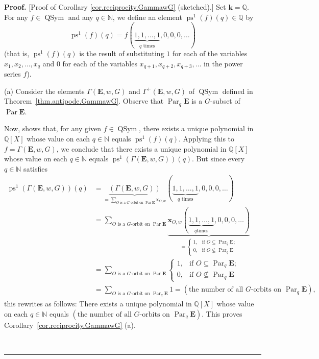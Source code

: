 \documentclass[numbers=enddot,12pt,final,onecolumn,notitlepage,abstracton]{scrartcl}%
\theoremstyle{definition}
\newenvironment{proof}[1][Proof]{\noindent\textbf{#1.} }{\ \rule{0.5em}{0.5em}}
\let\sumnonlimits\sum
\renewcommand{\sum}{\sumnonlimits\limits}
\newcommand{\kk}{{\mathbf{k}}}
\newcommand{\xx}{{\mathbf{x}}}
\newcommand{\QSym}{{\operatorname{QSym}}}
\newcommand{\Par}{\operatorname{Par}}
\newcommand{\EE}{{\mathbf{E}}}
\newcommand{\NN}{{\mathbb{N}}}
\newcommand{\QQ}{{\mathbb{Q}}}
\begin{document}
\begin{proof}
[Proof of Corollary \ref{cor.reciprocity.GammawG} (sketched).]
Set $\kk = \QQ$. For any $f \in \QSym$ and any
$q\in \NN $, we define an element $\operatorname{ps}^{1}\left(
f\right)  \left(  q\right)  \in \QQ$ by
\[
\operatorname{ps}^{1}\left(  f\right)  \left(  q\right)  =f\left(
\underbrace{1,1,\ldots,1}_{q\text{ times}},0,0,0,\ldots\right)
\]
(that is, $\operatorname{ps}^{1}\left(  f\right)  \left(  q\right)
$ is the result of substituting $1$ for each of the variables
$x_{1},x_{2},\ldots,x_{q}$ and $0$ for each of the variables
$x_{q+1},x_{q+2},x_{q+3},\ldots$ in the power series $f$).

(a) Consider the elements $\Gamma\left(   \EE ,w,G\right)  $ and
$\Gamma^{+}\left( \EE ,w,G \right)  $ of $\QSym$
defined in Theorem~\ref{thm.antipode.GammawG}. Observe that
$\Par_q \EE$ is a $G$-subset of $\Par \EE$.

Now, \cite[Proposition 7.7 (i)]{Reiner} shows that, for any given
$f\in \QSym $, there exists a unique polynomial in $\mathbb{Q}%
\left[  X\right]  $ whose value on each $q\in \NN $ equals
$\operatorname{ps}^{1}\left(  f\right)  \left(  q\right)  $.
Applying this to $f=\Gamma\left(   \EE ,w,G\right)  $, we conclude that
there exists a unique polynomial in $\mathbb{Q}\left[  X\right]  $ whose value
on each $q\in \NN $ equals $\operatorname{ps}^{1}\left(
\Gamma\left(   \EE ,w,G\right)  \right)  \left(  q\right)  $. But since
every $q\in \NN $ satisfies
\begin{align}
\operatorname{ps}^{1}\left(  \Gamma\left(   \EE ,w,G\right)
\right)  \left(  q\right)   &  =\underbrace{\left(  \Gamma\left( \EE
,w,G\right)  \right)  }_{=\sum_{O\text{ is a }G\text{-orbit on }
\Par \EE } \xx_{O,w}}\left(
\underbrace{1,1,\ldots,1}_{q\text{ times}},0,0,0,\ldots\right) \nonumber\\
&  =\sum_{O\text{ is a }G\text{-orbit on } \Par \EE}
\underbrace{\xx_{O,w}\left(  \underbrace{1,1,\ldots,1}_{q\text{
times}},0,0,0,\ldots\right)  }_{=%
\begin{cases}
1, & \text{if }O\subseteq \Par_q \EE ;\\
0, & \text{if }O\not \subseteq \Par_q \EE
\end{cases}
}\nonumber\\
&  =\sum_{O\text{ is a }G\text{-orbit on } \Par \EE }
\begin{cases}
1, & \text{if }O\subseteq \Par_q \EE ;\\
0, & \text{if }O\not \subseteq \Par_q \EE
\end{cases}
\nonumber\\
& = \sum_{O\text{ is a }G\text{-orbit on } \Par_{q} \EE} 1
=\left(  \text{the number of all }G\text{-orbits on }
\Par_q \EE \right)  ,
\label{pf.cor.reciprocity.GammawG.a.1}
\end{align}
this rewrites as follows: There exists a unique polynomial in $\QQ
\left[  X\right]  $ whose value on each $q\in \NN $ equals $\left(
\text{the number of all }G\text{-orbits on } \Par_q \EE
\right)  $. This proves Corollary~\ref{cor.reciprocity.GammawG} (a).


\end{proof}
\end{document}

